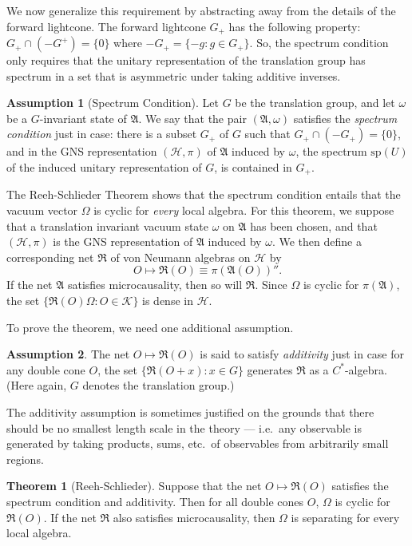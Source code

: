 \documentclass[12pt]{article}
\newcommand{\alg}[1]{\mathfrak{#1}}
\theoremstyle{definition}
\newtheorem{assumption}{Assumption}
\newtheorem{thm}{Theorem}[section]
\theoremstyle{definition}
\theoremstyle{remark}
\def\2#1{{\mathcal #1}}
\def\al#1{{\mathfrak #1}}
\def\om{\omega} \def\Om{\Omega} \def\dd{\partial} \def\D{\Delta}
\begin{document}
We now generalize this requirement by abstracting away
from the details of the forward lightcone.  The forward
lightcone $G_+$ has the following property: $G_+\cap
(-G^+)=\{ 0\}$ where $-G_+=\{ -g:g\in G_+\}$.  So, the
spectrum condition only requires that the unitary
representation of the translation group has spectrum in
a set that is asymmetric under taking additive
inverses.

\begin{assumption}[Spectrum Condition] Let $G$ be the translation
  group, and let $\om$ be a $G$-invariant state of $\al A$.  We say
  that the pair $(\al A,\om )$ satisfies the \emph{spectrum condition}
  just in case: there is a subset $G_+$ of $G$ such that $G_+\cap
  (-G_+)=\{ 0\}$, and in the GNS representation $(\2H ,\pi )$ of $\al
  A$ induced by $\om$, the spectrum $\mathrm{sp}(U)$ of the induced
  unitary representation of $G$, is contained in $G_+$.
  \label{spectrum}
\end{assumption}

The Reeh-Schlieder Theorem shows that the spectrum
condition entails that the vacuum vector $\Om$ is
cyclic for \emph{every} local algebra.  For this
theorem, we suppose that a translation invariant vacuum
state $\om$ on $\alg{A}$ has been chosen, and that
$(\2H ,\pi )$ is the GNS representation of $\alg{A}$
induced by $\om$.  We then define a corresponding net
$\alg{R}$ of von Neumann algebras on $\2H$ by
$$O\mapsto \alg{R}(O)\equiv \pi
(\alg{A}(O))'' .$$ If the net $\alg{A}$ satisfies microcausality, then so will
$\alg{R}$.  Since $\Om$ is cyclic for $\pi (\alg{A})$, the set $\{ \alg{R}(O)\Om
:O\in \2K \}$ is dense in $\2H$.

To prove the theorem, we need one additional assumption.
\begin{assumption} The net $O\mapsto \alg{R}(O)$ is
  said to satisfy \emph{additivity} just in case for
  any double cone $O$, the set $\{ \al R(O+x):x\in G\}$
  generates $\al R$ as a $C^*$-algebra. (Here again,
  $G$ denotes the translation group.)  \label{add}
\end{assumption}
The additivity assumption is sometimes justified on the grounds that there should be
no smallest length scale in the theory --- i.e.\ any observable is generated by
taking products, sums, etc.\ of observables from arbitrarily small regions.

\begin{thm}[Reeh-Schlieder] Suppose that the net $O\mapsto \alg{R}(O)$ satisfies the
  spectrum condition and additivity.  Then for all double cones $O$, $\Om$ is cyclic
  for $\alg{R}(O)$.  If the net $\alg{R}$ also satisfies microcausality, then $\Om$
  is separating for every local algebra.
\end{thm}
\end{document}
